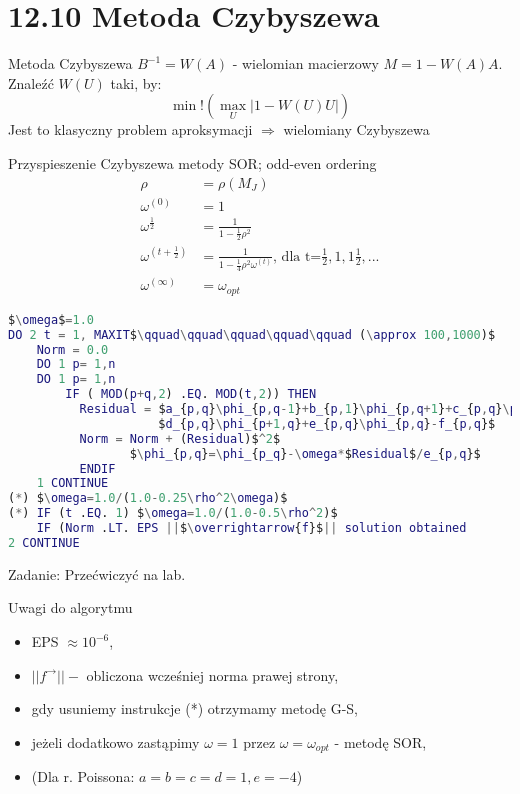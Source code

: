 \section{12.10 Metoda Czybyszewa}

\begin{frame}{Metoda Czybyszewa}
  $B^{-1}=W(A)$ - wielomian macierzowy $M=1-W(A)A$. Znaleźć $W(U)$ taki, by:
  $$\min!({\max_{U}{|1-W(U)U|}})$$
  Jest to klasyczny problem aproksymacji $\Rightarrow$ wielomiany Czybyszewa
\end{frame}

\begin{frame}
  \begin{block}{Przyspieszenie Czybyszewa metody SOR; odd-even ordering}
    \begin{align*}
    \rho &= \rho(M_J)\\
    \omega^{(0)}&=1\\
    \omega^{\frac{1}{2}}&=\frac{1}{1-\frac{1}{2}\rho^2}\\
    \omega^{(t+\frac{1}{2})}&=\frac{1}{1-\frac{1}{4}\rho^2\omega^{(t)}}\text{, dla t=}\frac{1}{2},1,1\frac{1}{2},...\\
    \omega^{(\infty)} &= \omega_{opt}
    \end{align*}
  \end{block}
\end{frame}

\begin{frame}[fragile]{}
\begin{lstlisting}[language=Matlab, mathescape]
$\omega$=1.0
DO 2 t = 1, MAXIT$\qquad\qquad\qquad\qquad\qquad (\approx 100,1000)$
    Norm = 0.0
    DO 1 p= 1,n
    DO 1 p= 1,n
        IF ( MOD(p+q,2) .EQ. MOD(t,2)) THEN
          Residual = $a_{p,q}\phi_{p,q-1}+b_{p,1}\phi_{p,q+1}+c_{p,q}\phi_{p-1,q}+$
                     $d_{p,q}\phi_{p+1,q}+e_{p,q}\phi_{p,q}-f_{p,q}$
          Norm = Norm + (Residual)$^2$
                 $\phi_{p,q}=\phi_{p_q}-\omega*$Residual$/e_{p,q}$
          ENDIF
    1 CONTINUE
(*) $\omega=1.0/(1.0-0.25\rho^2\omega)$
(*) IF (t .EQ. 1) $\omega=1.0/(1.0-0.5\rho^2)$
    IF (Norm .LT. EPS ||$\overrightarrow{f}$|| solution obtained
2 CONTINUE
\end{lstlisting}
  \hfill\hfill Zadanie: Przećwiczyć na lab.
\end{frame}

\begin{frame}{}
  \begin{block}{Uwagi do algorytmu}
    \begin{itemize}
      \item EPS $\approx 10^{-6}$,
      \item $||f^\rightarrow|| -$ obliczona wcześniej norma prawej strony,
      \item gdy usuniemy instrukcje (*) otrzymamy metodę G-S,
      \item jeżeli dodatkowo zastąpimy $\omega=1$ przez $\omega=\omega_{opt}$ - metodę SOR,
      \item (Dla r. Poissona: $a=b=c=d=1, e=-4$)
    \end{itemize}
  \end{block}
\end{frame}

